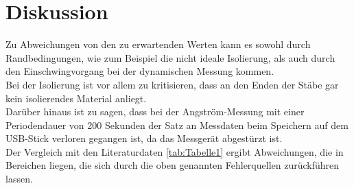 \section{Diskussion}
\label{sec:Diskussion}

Zu Abweichungen von den zu erwartenden Werten kann es sowohl durch Randbedingungen, wie zum 
Beispiel die nicht ideale Isolierung, als auch durch den Einschwingvorgang bei der 
dynamischen Messung kommen. \\
Bei der Isolierung ist vor allem zu kritisieren, dass an den Enden der Stäbe gar kein 
isolierendes Material anliegt.\\

Darüber hinaus ist zu sagen, dass bei der Angström-Messung mit einer Periodendauer von 
200 Sekunden der Satz an Messdaten beim Speichern auf dem USB-Stick verloren gegangen ist, 
da das Messgerät abgestürzt ist.\\

Der Vergleich mit den Literaturdaten \ref{tab:Tabelle1} ergibt Abweichungen, die in Bereichen liegen,
die sich durch die oben genannten Fehlerquellen zurückführen lassen.
